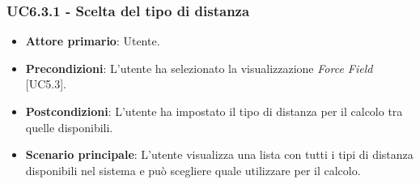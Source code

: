 \subsubsection{UC6.3.1 - Scelta del tipo di distanza}
\begin{itemize}
	\item \textbf{Attore primario}: Utente.
	\item \textbf{Precondizioni}: L'utente ha selezionato la visualizzazione \textit{Force Field} [UC5.3].
	\item \textbf{Postcondizioni}: L'utente ha impostato il tipo di distanza per il calcolo tra quelle disponibili.
	
	\item \textbf{Scenario principale}: L'utente visualizza una lista con tutti i tipi di distanza disponibili nel sistema e può scegliere quale utilizzare per il calcolo.
\end{itemize}